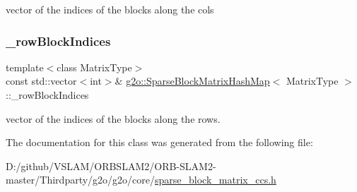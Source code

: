vector of the indices of the blocks along the cols 

\mbox{\label{classg2o_1_1_sparse_block_matrix_hash_map_ab002c32872fbce7d3485a5032eaee0de}} 
\subsubsection{\texorpdfstring{\+\_\+row\+Block\+Indices}{\_rowBlockIndices}}
{\footnotesize\ttfamily template$<$class Matrix\+Type$>$ \\
const std\+::vector$<$int$>$\& \mbox{\hyperlink{classg2o_1_1_sparse_block_matrix_hash_map}{g2o\+::\+Sparse\+Block\+Matrix\+Hash\+Map}}$<$ Matrix\+Type $>$\+::\+\_\+row\+Block\+Indices\hspace{0.3cm}{\ttfamily [protected]}}



vector of the indices of the blocks along the rows. 



The documentation for this class was generated from the following file\+:\begin{DoxyCompactItemize}
\item 
D\+:/github/\+V\+S\+L\+A\+M/\+O\+R\+B\+S\+L\+A\+M2/\+O\+R\+B-\/\+S\+L\+A\+M2-\/master/\+Thirdparty/g2o/g2o/core/\mbox{\hyperlink{sparse__block__matrix__ccs_8h}{sparse\+\_\+block\+\_\+matrix\+\_\+ccs.\+h}}\end{DoxyCompactItemize}
